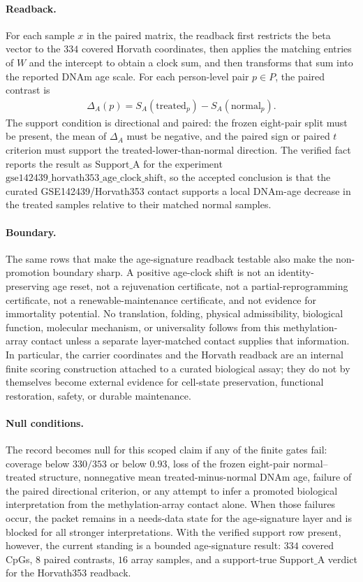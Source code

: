 \paragraph{Readback.}
For each sample $x$ in the paired matrix, the readback first restricts the beta vector to the $334$ covered Horvath coordinates, then applies the matching entries of $W$ and the intercept to obtain a clock sum, and then transforms that sum into the reported DNAm age scale. For each person-level pair $p\in P$, the paired contrast is
$$
\begin{aligned}
\Delta_A(p)=S_A(\mathrm{treated}_p)-S_A(\mathrm{normal}_p).
\end{aligned}
$$
The support condition is directional and paired: the frozen eight-pair split must be present, the mean of $\Delta_A$ must be negative, and the paired sign or paired $t$ criterion must support the treated-lower-than-normal direction. The verified fact reports the result as $\mathrm{Support\_A}$ for the experiment $\mathrm{gse142439\_horvath353\_age\_clock\_shift}$, so the accepted conclusion is that the curated GSE142439/Horvath353 contact supports a local DNAm-age decrease in the treated samples relative to their matched normal samples.

\paragraph{Boundary.}
The same rows that make the age-signature readback testable also make the non-promotion boundary sharp. A positive age-clock shift is not an identity-preserving age reset, not a rejuvenation certificate, not a partial-reprogramming certificate, not a renewable-maintenance certificate, and not evidence for immortality potential. No translation, folding, physical admissibility, biological function, molecular mechanism, or universality follows from this methylation-array contact unless a separate layer-matched contact supplies that information. In particular, the carrier coordinates and the Horvath readback are an internal finite scoring construction attached to a curated biological assay; they do not by themselves become external evidence for cell-state preservation, functional restoration, safety, or durable maintenance.

\paragraph{Null conditions.}
The record becomes null for this scoped claim if any of the finite gates fail: coverage below $330/353$ or below $0.93$, loss of the frozen eight-pair normal--treated structure, nonnegative mean treated-minus-normal DNAm age, failure of the paired directional criterion, or any attempt to infer a promoted biological interpretation from the methylation-array contact alone. When those failures occur, the packet remains in a needs-data state for the age-signature layer and is blocked for all stronger interpretations. With the verified support row present, however, the current standing is a bounded age-signature result: $334$ covered CpGs, $8$ paired contrasts, $16$ array samples, and a support-true $\mathrm{Support\_A}$ verdict for the Horvath353 readback.

